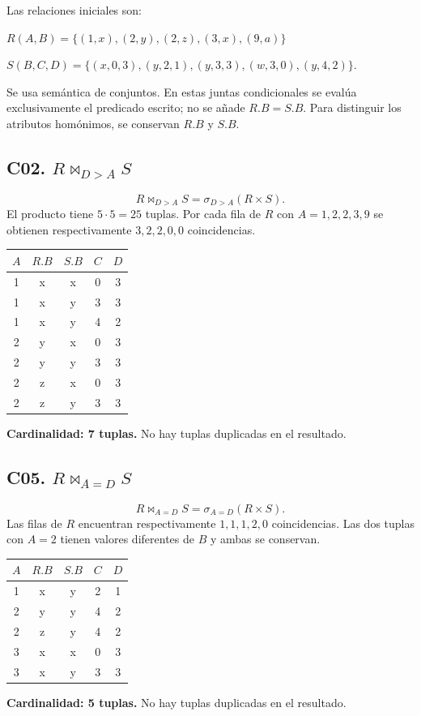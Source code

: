 Las relaciones iniciales son:\par $R(A,B)=\{(1,x),(2,y),(2,z),(3,x),(9,a)\}$\par $S(B,C,D)=\{(x,0,3),(y,2,1),(y,3,3),(w,3,0),(y,4,2)\}$.

Se usa semántica de conjuntos. En estas juntas condicionales se evalúa exclusivamente el predicado escrito; no se añade $R.B=S.B$. Para distinguir los atributos homónimos, se conservan $R.B$ y $S.B$.
\subsection*{C02. $R\bowtie_{D>A}S$}
\[R\bowtie_{D>A}S=\sigma_{D>A}(R\times S).\]
El producto tiene $5\cdot5=25$ tuplas. Por cada fila de $R$ con $A=1,2,2,3,9$ se obtienen respectivamente $3,2,2,0,0$ coincidencias.
\begin{center}\begin{tabular}{ccccc}\toprule\rowcolor{Fondo} $A$ & $R.B$ & $S.B$ & $C$ & $D$\\\midrule
1 & x & x & 0 & 3\\
1 & x & y & 3 & 3\\
1 & x & y & 4 & 2\\
2 & y & x & 0 & 3\\
2 & y & y & 3 & 3\\
2 & z & x & 0 & 3\\
2 & z & y & 3 & 3\\\bottomrule\end{tabular}\end{center}
\textbf{Cardinalidad: 7 tuplas.} No hay tuplas duplicadas en el resultado.
\subsection*{C05. $R\bowtie_{A=D}S$}
\[R\bowtie_{A=D}S=\sigma_{A=D}(R\times S).\]
Las filas de $R$ encuentran respectivamente $1,1,1,2,0$ coincidencias. Las dos tuplas con $A=2$ tienen valores diferentes de $B$ y ambas se conservan.
\begin{center}\begin{tabular}{ccccc}\toprule\rowcolor{Fondo} $A$ & $R.B$ & $S.B$ & $C$ & $D$\\\midrule
1 & x & y & 2 & 1\\
2 & y & y & 4 & 2\\
2 & z & y & 4 & 2\\
3 & x & x & 0 & 3\\
3 & x & y & 3 & 3\\\bottomrule\end{tabular}\end{center}
\textbf{Cardinalidad: 5 tuplas.} No hay tuplas duplicadas en el resultado.
